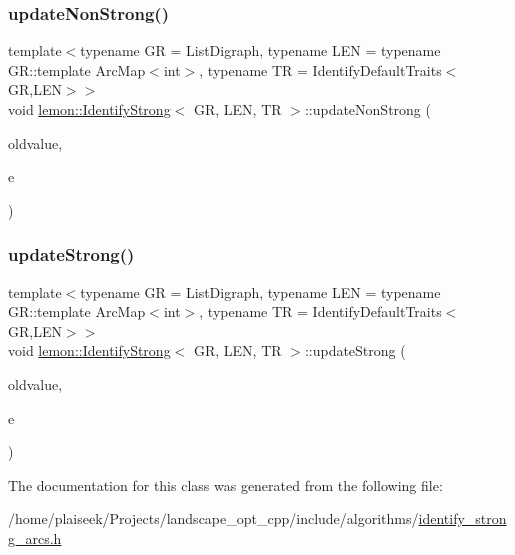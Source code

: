 \subsubsection{\texorpdfstring{update\+Non\+Strong()}{updateNonStrong()}}
{\footnotesize\ttfamily template$<$typename GR  = List\+Digraph, typename L\+EN  = typename G\+R\+::template Arc\+Map$<$int$>$, typename TR  = Identify\+Default\+Traits$<$\+G\+R,\+L\+E\+N$>$$>$ \\
void \hyperlink{classlemon_1_1_identify_strong}{lemon\+::\+Identify\+Strong}$<$ GR, L\+EN, TR $>$\+::update\+Non\+Strong (\begin{DoxyParamCaption}\item[{\hyperlink{classlemon_1_1_identify_strong_a6b5339bd594571c5085ef41d9ddeafa0}{Labeled\+Dist} \&}]{oldvalue,  }\item[{Arc \&}]{e }\end{DoxyParamCaption})\hspace{0.3cm}{\ttfamily [inline]}}

\mbox{\label{classlemon_1_1_identify_strong_ae2780dc0b6fbf60925fd85489b9878ae}} 
\subsubsection{\texorpdfstring{update\+Strong()}{updateStrong()}}
{\footnotesize\ttfamily template$<$typename GR  = List\+Digraph, typename L\+EN  = typename G\+R\+::template Arc\+Map$<$int$>$, typename TR  = Identify\+Default\+Traits$<$\+G\+R,\+L\+E\+N$>$$>$ \\
void \hyperlink{classlemon_1_1_identify_strong}{lemon\+::\+Identify\+Strong}$<$ GR, L\+EN, TR $>$\+::update\+Strong (\begin{DoxyParamCaption}\item[{\hyperlink{classlemon_1_1_identify_strong_a6b5339bd594571c5085ef41d9ddeafa0}{Labeled\+Dist} \&}]{oldvalue,  }\item[{Arc \&}]{e }\end{DoxyParamCaption})\hspace{0.3cm}{\ttfamily [inline]}}



The documentation for this class was generated from the following file\+:\begin{DoxyCompactItemize}
\item 
/home/plaiseek/\+Projects/landscape\+\_\+opt\+\_\+cpp/include/algorithms/\hyperlink{identify__strong__arcs_8h}{identify\+\_\+strong\+\_\+arcs.\+h}\end{DoxyCompactItemize}
